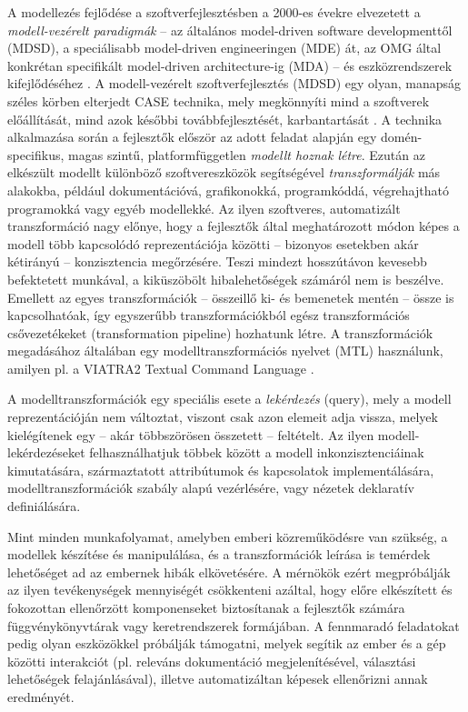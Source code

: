 A modellezés fejlődése a szoftverfejlesztésben a 2000-es évekre elvezetett a \emph{modell-vezérelt paradigmák} -- az általános model-driven software developmenttől (\gls{MDSD}), a speciálisabb model-driven engineeringen (\gls{MDE}) át, az \gls{OMG} által konkrétan specifikált model-driven architecture-ig (\gls{MDA}) -- és eszközrendszerek kifejlődéséhez \cite{OMG:MDA:FAQ,Schmidt:MDE:10.1109/MC.2006.58,MDSD:TEM06}.
A modell-vezérelt szoftverfejlesztés (\gls{MDSD}) egy olyan, manapság széles körben elterjedt \gls{CASE} technika, mely megkönnyíti mind a szoftverek előállítását, mind azok későbbi továbbfejlesztését, karbantartását \cite{MDSD:TEM06}.
A technika alkalmazása során a fejlesztők először az adott feladat alapján egy domén-specifikus, magas szintű, platformfüggetlen \emph{modellt hoznak létre}.
Ezután az elkészült modellt különböző szoftvereszközök segítségével \emph{transzformálják} más alakokba, például dokumentációvá, grafikonokká, programkóddá, végrehajtható programokká vagy egyéb modellekké.
Az ilyen szoftveres, automatizált transzformáció nagy előnye, hogy a fejlesztők által meghatározott módon képes a modell több kapcsolódó reprezentációja közötti -- bizonyos esetekben akár kétirányú -- konzisztencia megőrzésére.
Teszi mindezt hosszútávon kevesebb befektetett munkával, a kiküszöbölt hibalehetőségek számáról nem is beszélve.
Emellett az egyes transzformációk -- összeillő ki- és bemenetek mentén -- össze is kapcsolhatóak, így egyszerűbb transzformációkból egész transzformációs csővezetékeket (transformation pipeline) hozhatunk létre.
A transzformációk megadásához általában egy modelltranszformációs nyelvet (\gls{MTL}) használunk, amilyen pl. a VIATRA2 Textual Command Language \cite{Balogh:2006:AMT:1141277.1141575}.

A modelltranszformációk egy speciális esete a \emph{lekérdezés} (query), mely a modell reprezentációján nem változtat, viszont csak azon elemeit adja vissza, melyek kielégítenek egy -- akár többszörösen összetett -- feltételt.
Az ilyen modell-lekérdezéseket felhasználhatjuk többek között a modell inkonzisztenciáinak kimutatására, származtatott attribútumok és kapcsolatok implementálására, modelltranszformációk szabály alapú vezérlésére, vagy nézetek deklaratív definiálására.

Mint minden munkafolyamat, amelyben emberi közreműködésre van szükség, a modellek készítése és manipulálása, és a transzformációk leírása is temérdek lehetőséget ad az embernek hibák elkövetésére.
A mérnökök ezért megpróbálják az ilyen tevékenységek mennyiségét csökkenteni azáltal, hogy előre elkészített és fokozottan ellenőrzött komponenseket biztosítanak a fejlesztők számára függvénykönyvtárak vagy keretrendszerek formájában.
A fennmaradó feladatokat pedig olyan eszközökkel próbálják támogatni, melyek segítik az ember és a gép közötti interakciót (pl. releváns dokumentáció megjelenítésével, választási lehetőségek felajánlásával), illetve automatizáltan képesek ellenőrizni annak eredményét.


